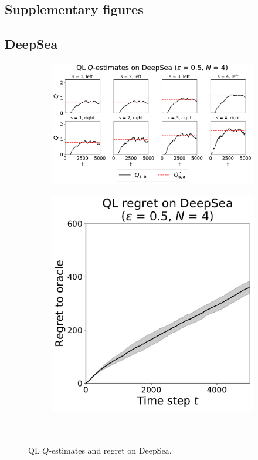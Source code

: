 \documentclass{article}
\begin{document}
\begin{appendices}
\clearpage
\section{Supplementary figures} \label{app:supfig}

\subsection{DeepSea}

\begin{figure}[h!]
\centering
\begin{subfigure}{0.65\textwidth}
\includegraphics[width=\linewidth]{img/ql-0_5-qestimates-deepsea-4.pdf}
\end{subfigure}
\begin{subfigure}{0.34\textwidth}
\includegraphics[width=\linewidth]{img/ql-0_5-regret-deepsea-4.pdf}~\\~\\
\end{subfigure}
\captionsetup{width=0.9\linewidth}
\caption{QL $Q$-estimates and regret on DeepSea.}\label{ql_deepsea_visual}
\end{figure}


\end{appendices}
\end{document}
